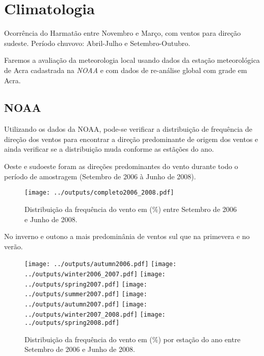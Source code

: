 \section{Climatologia}

Ocorrência do Harmatão entre Novembro e Março, com ventos para direção sudeste.
Período chuvovo: Abril-Julho e Setembro-Outubro.

Faremos a avaliação da meteorologia local usando dados da estação meteorológica
de Acra cadastrada na \textit{NOAA} e com dados de re-análise global com grade
em Acra. 

\subsection{NOAA}
Utilizando os dados da NOAA, pode-se verificar a distribuição de frequência de
direção dos ventos para encontrar a direção predominante de origem dos ventos e 
ainda verificar se a distribuição muda conforme as estãções do ano.  


Oeste e sudoeste foram as direções predominantes do vento durante todo o período 
de amostragem (Setembro de 2006 à Junho de 2008).
 
\begin{figure}[H]
\begin{center}
  \texttt{[image: ../outputs/completo2006\_2008.pdf]}
  \caption{Distribuição da frequência do vento em (\%) entre
           Setembro de 2006 e Junho de 2008.}
\end{center}
\end{figure}


No inverno e outono a mais predominânia de ventos sul que na primevera 
e no verão. 

\begin{figure}[H]
\begin{center}
  \texttt{[image: ../outputs/autumn2006.pdf]}
  \texttt{[image: ../outputs/winter2006\_2007.pdf]}
  \texttt{[image: ../outputs/spring2007.pdf]}
  \texttt{[image: ../outputs/summer2007.pdf]}
  \texttt{[image: ../outputs/autumn2007.pdf]}
  \texttt{[image: ../outputs/winter2007\_2008.pdf]}
  \texttt{[image: ../outputs/spring2008.pdf]}
\end{center}
\caption{Distribuição da frequência do vento em (\%) por estação do ano entre
         Setembro de 2006 e Junho de 2008.}
\end{figure}

